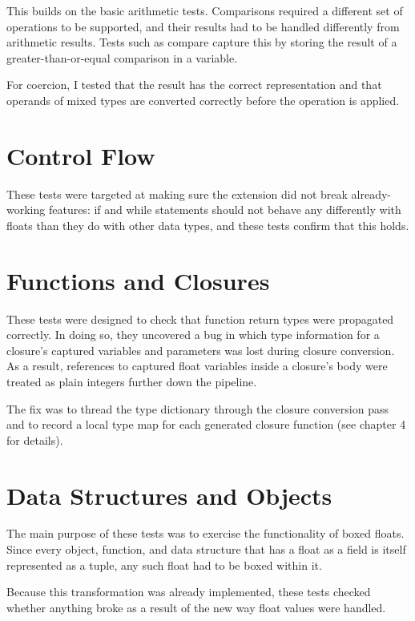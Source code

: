 This builds on the basic arithmetic tests. Comparisons required a different set of operations to be supported, and their results had to be handled differently from arithmetic results. Tests such as compare capture this by storing the result of a greater-than-or-equal comparison in a variable.

For coercion, I tested that the result has the correct representation and that operands of mixed types are converted correctly before the operation is applied.

\section{Control Flow}

These tests were targeted at making sure the extension did not break already-working features: if and while statements should not behave any differently with floats than they do with other data types, and these tests confirm that this holds.

\section{Functions and Closures}

These tests were designed to check that function return types were propagated correctly. In doing so, they uncovered a bug in which type information for a closure's captured variables and parameters was lost during closure conversion. As a result, references to captured float variables inside a closure's body were treated as plain integers further down the pipeline.

The fix was to thread the type dictionary through the closure conversion pass and to record a local type map for each generated closure function (see chapter 4 for details).

\section{Data Structures and Objects}

The main purpose of these tests was to exercise the functionality of boxed floats. Since every object, function, and data structure that has a float as a field is itself represented as a tuple, any such float had to be boxed within it.

Because this transformation was already implemented, these tests checked whether anything broke as a result of the new way float values were handled.

